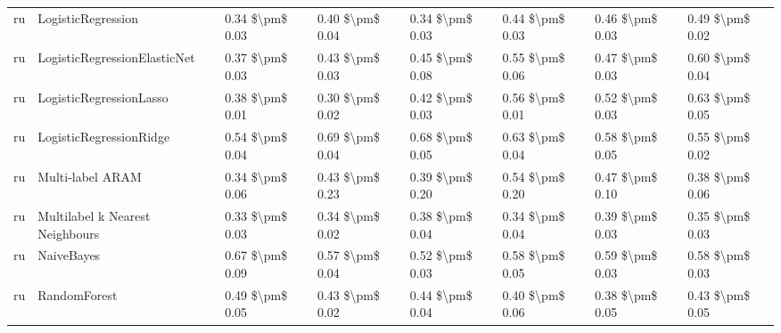 \begin{tabular}{llllllll}
      ru &              LogisticRegression &     0.34 \$\textbackslash pm\$ 0.03 &           0.40 \$\textbackslash pm\$ 0.04 &       0.34 \$\textbackslash pm\$ 0.03 &        0.44 \$\textbackslash pm\$ 0.03 &                         0.46 \$\textbackslash pm\$ 0.03 &     0.49 \$\textbackslash pm\$ 0.02 \\
      ru &    LogisticRegressionElasticNet &     0.37 \$\textbackslash pm\$ 0.03 &           0.43 \$\textbackslash pm\$ 0.03 &       0.45 \$\textbackslash pm\$ 0.08 &        0.55 \$\textbackslash pm\$ 0.06 &                         0.47 \$\textbackslash pm\$ 0.03 &     0.60 \$\textbackslash pm\$ 0.04 \\
      ru &         LogisticRegressionLasso &     0.38 \$\textbackslash pm\$ 0.01 &           0.30 \$\textbackslash pm\$ 0.02 &       0.42 \$\textbackslash pm\$ 0.03 &        0.56 \$\textbackslash pm\$ 0.01 &                         0.52 \$\textbackslash pm\$ 0.03 &     0.63 \$\textbackslash pm\$ 0.05 \\
      ru &         LogisticRegressionRidge &     0.54 \$\textbackslash pm\$ 0.04 &           0.69 \$\textbackslash pm\$ 0.04 &       0.68 \$\textbackslash pm\$ 0.05 &        0.63 \$\textbackslash pm\$ 0.04 &                         0.58 \$\textbackslash pm\$ 0.05 &     0.55 \$\textbackslash pm\$ 0.02 \\
      ru &                Multi-label ARAM &     0.34 \$\textbackslash pm\$ 0.06 &           0.43 \$\textbackslash pm\$ 0.23 &       0.39 \$\textbackslash pm\$ 0.20 &        0.54 \$\textbackslash pm\$ 0.20 &                         0.47 \$\textbackslash pm\$ 0.10 &     0.38 \$\textbackslash pm\$ 0.06 \\
      ru & Multilabel k Nearest Neighbours &     0.33 \$\textbackslash pm\$ 0.03 &           0.34 \$\textbackslash pm\$ 0.02 &       0.38 \$\textbackslash pm\$ 0.04 &        0.34 \$\textbackslash pm\$ 0.04 &                         0.39 \$\textbackslash pm\$ 0.03 &     0.35 \$\textbackslash pm\$ 0.03 \\
      ru &                      NaiveBayes &     0.67 \$\textbackslash pm\$ 0.09 &           0.57 \$\textbackslash pm\$ 0.04 &       0.52 \$\textbackslash pm\$ 0.03 &        0.58 \$\textbackslash pm\$ 0.05 &                         0.59 \$\textbackslash pm\$ 0.03 &     0.58 \$\textbackslash pm\$ 0.03 \\
      ru &                    RandomForest &     0.49 \$\textbackslash pm\$ 0.05 &           0.43 \$\textbackslash pm\$ 0.02 &       0.44 \$\textbackslash pm\$ 0.04 &        0.40 \$\textbackslash pm\$ 0.06 &                         0.38 \$\textbackslash pm\$ 0.05 &     0.43 \$\textbackslash pm\$ 0.05 \\

\end{tabular}

